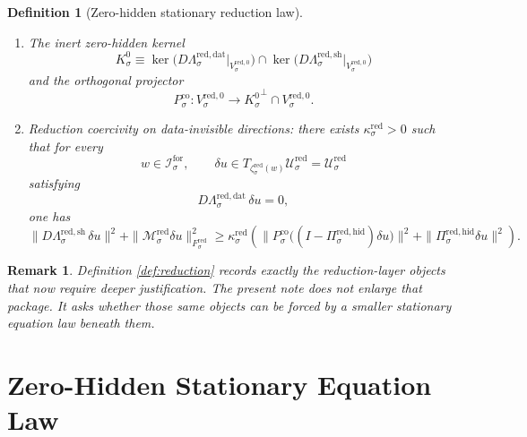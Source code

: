 \documentclass[11pt]{article}
\newcommand{\ForSpace}[1]{\mathcal I_{#1}^{\mathrm{for}}}
\newcommand{\Kernel}[1]{K_{#1}^{0}}
\newcommand{\StateComp}[1]{P_{#1}^{\mathrm{co}}}
\newcommand{\RedSpace}[1]{\mathcal U_{#1}^{\mathrm{red}}}
\newcommand{\RedBody}[1]{\mathcal B_{#1}^{\mathrm{red}}}
\newcommand{\RedData}[1]{\Lambda_{#1}^{\mathrm{red,dat}}}
\newcommand{\RedShell}[1]{\Lambda_{#1}^{\mathrm{red,sh}}}
\newcommand{\RedTarget}[1]{F_{#1}^{\mathrm{red}}}
\newcommand{\RedZero}[1]{V_{#1}^{\mathrm{red},0}}
\newcommand{\RedProj}[1]{\Pi_{#1}^{\mathrm{red,hid}}}
\newcommand{\RedLin}[1]{\mathcal M_{#1}^{\mathrm{red}}}
\newcommand{\RedEmbed}[1]{\zeta_{#1}^{\mathrm{red}}}
\newtheorem{definition}{Definition}
\newtheorem{remark}{Remark}
\begin{document}
\begin{definition}[Zero-hidden stationary reduction law]
\begin{enumerate}
\begin{equation}
    \RedBody{\sigma}\cap
    \RedZero{\sigma}\cap
    \bigl(\RedShell{\sigma}\bigr)^{-1}(0)
    \Bigr).
    \label{eq:redsolvability}
    \end{equation}
    \item The inert zero-hidden kernel
    \[
    \Kernel{\sigma}
    \equiv
    \ker\bigl(D\RedData{\sigma}\big|_{\RedZero{\sigma}}\bigr)
    \cap
    \ker\bigl(D\RedShell{\sigma}\big|_{\RedZero{\sigma}}\bigr)
    \]
    and the orthogonal projector
    \[
    \StateComp{\sigma}:
    \RedZero{\sigma}\to
    {\Kernel{\sigma}}^{\perp}\cap\RedZero{\sigma}.
    \]
    \item Reduction coercivity on data-invisible directions: there exists \(\kappa_{\sigma}^{\mathrm{red}}>0\) such that for every
    \[
    w\in\ForSpace{\sigma},
    \qquad
    \delta u\in T_{\RedEmbed{\sigma}(w)}\RedSpace{\sigma}=\RedSpace{\sigma}
    \]
    satisfying
    \[
    D\RedData{\sigma}\,\delta u=0,
    \]
    one has
    \begin{equation}
    \|D\RedShell{\sigma}\,\delta u\|^{2}
    +
    \|\RedLin{\sigma}\delta u\|_{\RedTarget{\sigma}}^{2}
    \ge
    \kappa_{\sigma}^{\mathrm{red}}
    \left(
    \|\StateComp{\sigma}\bigl((I-\RedProj{\sigma})\delta u\bigr)\|^{2}
    +
    \|\RedProj{\sigma}\delta u\|^{2}
    \right).
    \label{eq:redcoercive}
    \end{equation}
\end{enumerate}
\end{definition}

\begin{remark}
Definition \ref{def:reduction} records exactly the reduction-layer objects that now require deeper justification. The present note does not enlarge that package. It asks whether those same objects can be forced by a smaller stationary equation law beneath them.
\end{remark}

\section{Zero-Hidden Stationary Equation Law}
\end{document}
